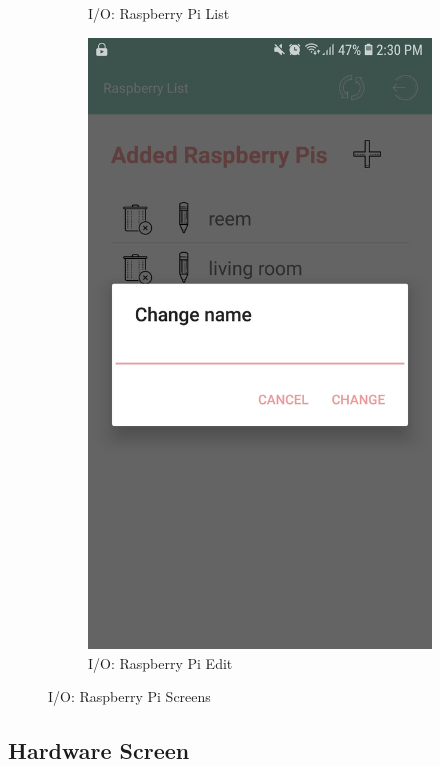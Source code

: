 \documentclass[12pt, oneside, a4paper]{book}
\begin{document}
\begin{figure}[H]
\begin{subfigure}[b]{.4\linewidth}
				\caption{I/O: Raspberry Pi List}
			\end{subfigure}
			\begin{subfigure}[b]{.4\linewidth}
				\includegraphics[width=\linewidth]{img/output_raspberry_edit.jpg}
				\caption{I/O: Raspberry Pi Edit}
			\end{subfigure}
			\caption{I/O: Raspberry Pi Screens}
			\label{output:rp}
		\end{figure}

		\newpage\subsection{Hardware Screen}
\end{document}
